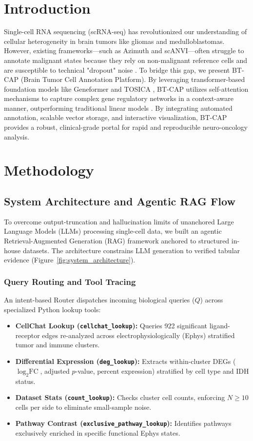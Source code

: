 \documentclass[conference]{IEEEtran}
\begin{document}
\section{Introduction}
Single-cell RNA sequencing (scRNA-seq) has revolutionized our understanding of cellular heterogeneity in brain tumors like gliomas and medulloblastomas. However, existing frameworks—such as Azimuth and scANVI—often struggle to annotate malignant states because they rely on non-malignant reference cells and are susceptible to technical "dropout" noise \cite{CHAUHAN2025100371}. To bridge this gap, we present BT-CAP (Brain Tumor Cell Annotation Platform). By leveraging transformer-based foundation models like Geneformer \cite{theodoris2023transfer} and TOSICA \cite{chen2023transformer}, BT-CAP utilizes self-attention mechanisms to capture complex gene regulatory networks in a context-aware manner, outperforming traditional linear models \cite{szalata2024transformers}. By integrating automated annotation, scalable vector storage, and interactive visualization, BT-CAP provides a robust, clinical-grade portal for rapid and reproducible neuro-oncology analysis.

\section{Methodology}

\subsection{System Architecture and Agentic RAG Flow}
To overcome output-truncation and hallucination limits of unanchored Large Language Models (LLMs) processing single-cell data, we built an agentic Retrieval-Augmented Generation (RAG) framework anchored to structured in-house datasets. The architecture constrains LLM generation to verified tabular evidence (Figure~\ref{fig:system_architecture}).

\subsubsection{Query Routing and Tool Tracing}
An intent-based Router dispatches incoming biological queries ($Q$) across specialized Python lookup tools:
\begin{itemize}
    \item \textbf{CellChat Lookup (\texttt{cellchat\_lookup}):} Queries 922 significant ligand-receptor edges re-analyzed across electrophysiologically (Ephys) stratified tumor and immune clusters.
    \item \textbf{Differential Expression (\texttt{deg\_lookup}):} Extracts within-cluster DEGs ($\log_2\text{FC}$, adjusted $p$-value, percent expression) stratified by cell type and IDH status.
    \item \textbf{Dataset Stats (\texttt{count\_lookup}):} Checks cluster cell counts, enforcing $N \ge 10$ cells per side to eliminate small-sample noise.
    \item \textbf{Pathway Contrast (\texttt{exclusive\_pathway\_lookup}):} Identifies pathways exclusively enriched in specific functional Ephys states.
\end{itemize}
\end{document}
